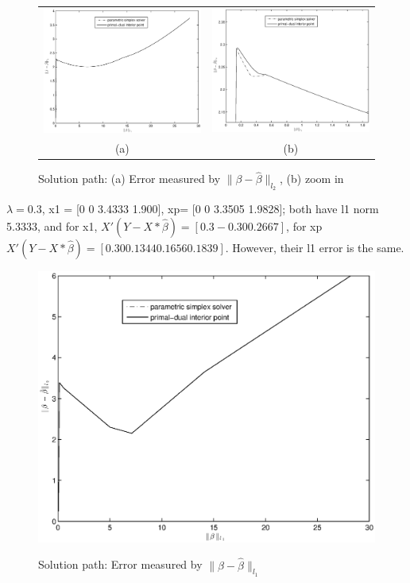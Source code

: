 \documentclass[]{article}
\begin{document}
\begin{figure}[htp!]\centering 
\begin{tabular}{cc}
\includegraphics[width=0.5 \textwidth]{compare1.eps}& 
\includegraphics[width=0.5 \textwidth]{compare1_1.eps}\\
(a) & (b)\\
\end{tabular}
\caption{Solution path: (a) Error measured by $\|\beta-\hat\beta\|_{l_2}$, (b) zoom in}
\end{figure}

$\lambda  = 0.3$, x1 = [0 0 3.4333 1.900], xp= [0 0 3.3505 1.9828]; both have l1 norm 5.3333, and 
for x1, $X'(Y-X*\hat\beta)=[ 0.3 -0.3 0 0.2667]$, for xp $X'(Y-X*\hat\beta) = [0.3 00.1344 0.1656 0.1839]$.
However, their l1 error is the same.

\begin{figure}[htp!]\centering 

\includegraphics[width=0.5 \textwidth]{compare12.eps}\\

\caption{Solution path: Error measured by $\|\beta-\hat\beta\|_{l_1}$}
\end{figure}
\end{document}
